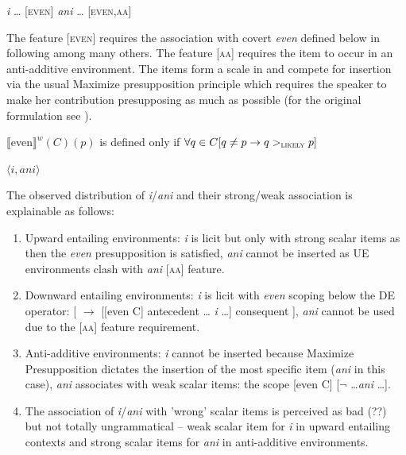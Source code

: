\documentclass[output=paper,
]{langscibook}
\begin{document}
\ea \ea \textit{i} {\ldots} [\textsc{even}]
\ex  \textit{ani} {\ldots} [\textsc{even},\textsc{aa}]
\z
\z

\noindent The feature [\textsc{even}] requires the association with covert \textit{even} defined below in  following \cite{crnivc2014against} among many others. The feature [\textsc{aa}] requires the item to occur in an anti-additive environment. The items form a scale in  and compete for insertion via the usual Maximize presupposition principle which requires the speaker to make her contribution presupposing as much as possible (for the original formulation see \citealt{heim1991articles}).

\ea\label{ex-46} $\llbracket$even$\rrbracket^w (C)(p)$ is defined only if
$\forall q \in C[q \neq p \rightarrow q >_{\textsc{likely}} p]$
\z

\ea\label{ex-47} $\langle i,ani\rangle$
\z

\noindent The observed distribution of \textit{i}/\textit{ani} and their strong/weak association is explainable as follows:

\begin{enumerate}
	\item Upward entailing environments: \textit{i} is licit but only with strong scalar items as then the \textit{even} presupposition is satisfied, \textit{ani} cannot be inserted as UE environments clash with \textit{ani} [\textsc{aa}] feature.
	\item Downward entailing environments: \textit{i} is licit with \textit{even} scoping below the DE operator:  {[} $\rightarrow$ {[}{[}even C{]} antecedent \ldots{} \textit{i} \ldots ] consequent ], \textit{ani} cannot be used due to the [\textsc{aa}] feature requirement.
	\item Anti-additive environments: \textit{i} cannot be inserted because Maximize Presupposition dictates the insertion of the most specific item (\textit{ani} in this case), \textit{ani} associates with weak scalar items: the scope [even C] [$\neg$ \ldots  \textit{ani} \ldots].
	\item The association of \textit{i}/\textit{ani} with 'wrong' scalar items is perceived as bad (??) but not totally ungrammatical -- weak scalar item for \textit{i} in upward entailing contexts and strong scalar items for \textit{ani} in anti-additive environments.
\end{enumerate}
\end{document}
